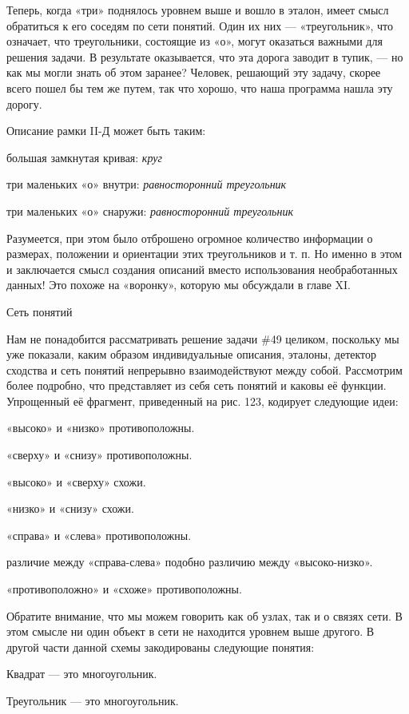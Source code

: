 \documentclass[../main.tex]{subfiles}
\begin{document}
Теперь, когда «три» поднялось уровнем выше и вошло в эталон, имеет смысл обратиться к его соседям по сети понятий. Один их них --- «треугольник», что означает, что треугольники, состоящие из «о», могут оказаться важными для решения задачи. В результате оказывается, что эта дорога заводит в тупик, --- но как мы могли знать об этом заранее? Человек, решающий эту задачу, скорее всего пошел бы тем же путем, так что хорошо, что наша программа нашла эту дорогу.

Описание рамки II-Д может быть таким:

большая замкнутая кривая: \emph{круг}

три маленьких «о» внутри: \emph{равносторонний треугольник}

три маленьких «о» снаружи: \emph{равносторонний треугольник}

Разумеется, при этом было отброшено огромное количество информации о размерах, положении и ориентации этих треугольников и т. п. Но именно в этом и заключается смысл создания описаний вместо использования необработанных данных! Это похоже на «воронку», которую мы обсуждали в главе XI.

Сеть понятий

Нам не понадобится рассматривать решение задачи \#49 целиком, поскольку мы уже показали, каким образом индивидуальные описания, эталоны, детектор сходства и сеть понятий непрерывно взаимодействуют между собой. Рассмотрим более подробно, что представляет из себя сеть понятий и каковы её функции. Упрощенный её фрагмент, приведенный на рис. 123, кодирует следующие идеи:

«высоко» и «низко» противоположны.

«сверху» и «снизу» противоположны.

«высоко» и «сверху» схожи.

«низко» и «снизу» схожи.

«справа» и «слева» противоположны.

различие между «справа-слева» подобно различию между «высоко-низко».

«противоположно» и «схоже» противоположны.

Обратите внимание, что мы можем говорить как об узлах, так и о связях сети. В этом смысле ни один объект в сети не находится уровнем выше другого. В другой части данной схемы закодированы следующие понятия:

Квадрат --- это многоугольник.

Треугольник --- это многоугольник.
\end{document}
